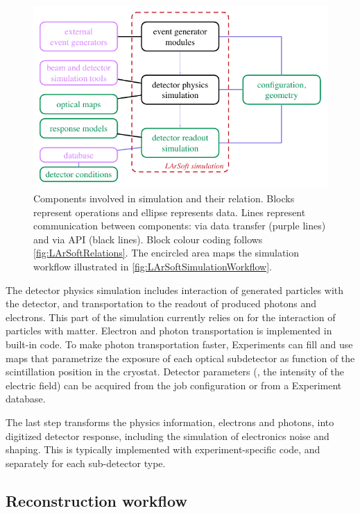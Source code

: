 \begin{figure}
   \centering
   \includegraphics{figures/LArSoftSimulationComponents}
   \caption[Relation between components for a typical reconstruction workflow]{
      \label{fig:LArSoftSimulationRelations}
      Components involved in simulation and their relation.
      Blocks represent operations and ellipse represents data.
      Lines represent communication between components: via data transfer (purple lines) and via API (black lines). 
      Block colour coding follows \cref{fig:LArSoftRelations}.
      The encircled area maps the simulation workflow illustrated in \cref{fig:LArSoftSimulationWorkflow}.
   }
\end{figure}
The detector physics simulation includes interaction of 
generated particles with the detector,
and transportation to the readout of produced photons and electrons.
This part of the simulation currently relies on \GEANT for the interaction of particles with matter.
Electron and photon transportation is implemented in built-in code.
To make photon transportation faster, Experiments can fill and use maps
that parametrize the exposure of each optical subdetector
as function of the scintillation position in the cryostat.
Detector parameters (\eg, the intensity of the electric field)
can be acquired from the job configuration or from a Experiment database.

The last step transforms the physics information, electrons and photons,
into digitized detector response,
including the simulation of electronics noise and shaping.
This is typically implemented with experiment-specific code,
and separately for each sub-detector type.


\subsection{Reconstruction workflow}
\label{ssec:Workflows:Reconstruction}

